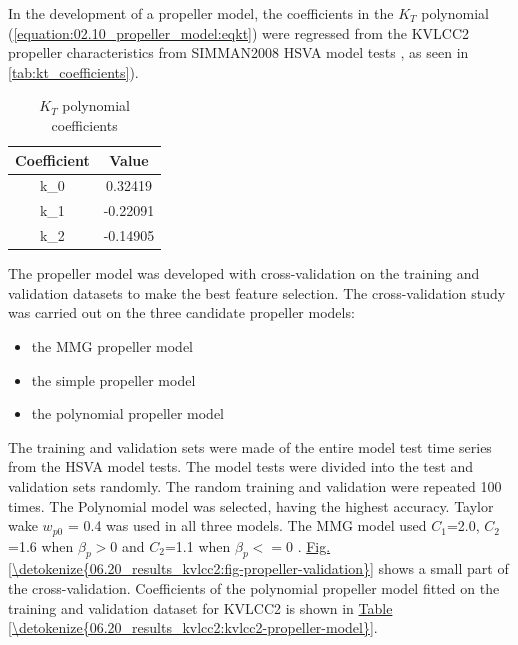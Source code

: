 In the development of a propeller model, the coefficients in the \(K_T\) polynomial (\autoref{equation:02.10_propeller_model:eqkt}) were regressed from the KVLCC2 propeller characteristics from SIMMAN2008 HSVA model tests \cite{stern_experience_2011}, as seen in \autoref{tab:kt_coefficients}).

\begin{table}[H]
    \centering
    \caption{\(K_T\) polynomial coefficients}
    \label{tab:kt_coefficients}
    \begin{tabular}{|c|c|}
        \hline
        Coefficient & Value \\
        \hline
        k_0 & 0.32419 \\
        k_1 & -0.22091 \\
        k_2 & -0.14905 \\
        \hline
    \end{tabular}

\end{table}

\noindent The propeller model was developed with cross-validation on the training and validation datasets to make the best feature selection.
The cross-validation study was carried out on the three candidate propeller models: 
\begin{itemize}
    \item the MMG propeller model
    \item the simple propeller model
    \item the polynomial propeller model
\end{itemize}
The training and validation sets were made of the entire model test time series from the HSVA model tests. The model tests were divided into the test and validation sets randomly. The random training and validation were repeated 100 times. The Polynomial model was selected, having the highest accuracy. Taylor wake \(w_{p0}\) = {0.4} was used in all three models. The MMG model used \(C_1\)={2.0}, \(C_2\)={1.6} when \(\beta_p>0\) and \(C_2\)={1.1} when \(\beta_p<=0\) \cite{yasukawa_introduction_2015-1}. \hyperref[\detokenize{06.20_results_kvlcc2:fig-propeller-validation}]{Fig.\@ \ref{\detokenize{06.20_results_kvlcc2:fig-propeller-validation}}} shows a small part of the cross-validation. Coefficients of the polynomial propeller model fitted on the training and validation dataset for KVLCC2 is shown in \hyperref[\detokenize{06.20_results_kvlcc2:kvlcc2-propeller-model}]{Table \ref{\detokenize{06.20_results_kvlcc2:kvlcc2-propeller-model}}}.

